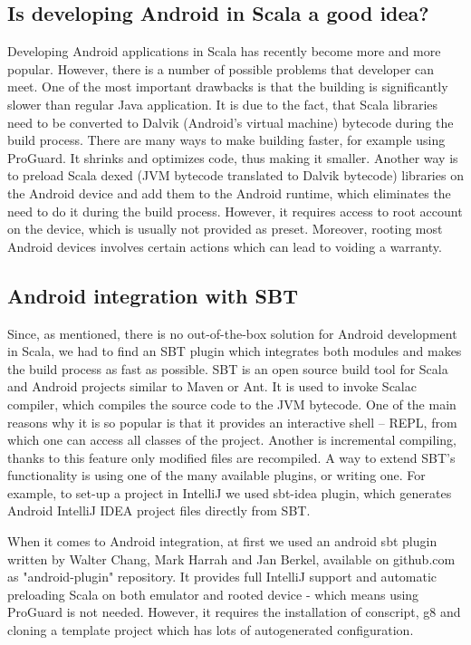 \subsection{Is developing Android in Scala a good idea?}
\label{subsec:good-idea}
Developing Android applications in Scala has recently become more and more popular. However, there is a number of possible problems that developer can meet. One of the most important drawbacks is that the building is significantly slower than regular Java application. It is due to the fact, that Scala libraries need to be converted to Dalvik (Android's virtual machine) bytecode during the build process. There are many ways to make building faster, for example using ProGuard. It shrinks and optimizes code, thus making it smaller\cite{Berkel:2011:preinstall}. Another way is to preload Scala dexed (JVM bytecode translated to Dalvik bytecode) libraries on the Android device and add them to the Android runtime, which eliminates the need to do it during the build process\cite{Berkel:2011:preinstall}. However, it requires access to root account on the device, which is usually not provided as preset. Moreover, rooting most Android devices involves certain actions which can lead to voiding a warranty. 

\subsection{Android integration with SBT}
\label{subsec:choosing-ide}
Since, as mentioned, there is no out-of-the-box solution for Android development in Scala, we had to find an SBT plugin which integrates both modules and makes the build process as fast as possible. SBT is an open source build tool for Scala and Android projects similar to Maven or Ant. It is used to invoke Scalac compiler, which compiles the source code to the JVM bytecode. One of the main reasons why it is so popular is that it provides an interactive shell -- REPL, from which one can access all classes of the project. Another is incremental compiling, thanks to this feature only modified files are recompiled\cite{Fatin:2012:NewWay}. A way to extend SBT's functionality is using one of the many available plugins, or writing one. For example, to set-up a project in IntelliJ  we used sbt-idea plugin, which generates Android IntelliJ IDEA project files directly from SBT.

When it comes to Android integration, at first we used an android sbt plugin written by Walter Chang, Mark Harrah and Jan Berkel, available on github.com as "android-plugin" repository. It provides full IntelliJ support and automatic preloading Scala on both emulator and rooted device - which means using ProGuard is not needed. However, it requires the installation of conscript, g8 and cloning a template project which has lots of autogenerated configuration\cite{Nguyen:2013:differences}. 	

